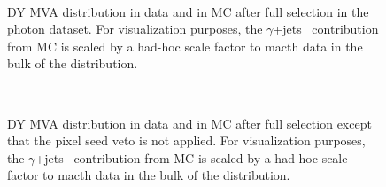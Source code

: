 \begin{figure}[!hbtp]
\begin{center}
\\
\caption{DY MVA distribution in data and in MC after full selection in the photon dataset.
For visualization purposes, the $\gamma$+jets~ contribution from MC is scaled by a had-hoc scale factor to macth data in the bulk of the distribution.
}
\label{fig:dymva_noscale}
\end{center}
\end{figure}

\begin{figure}[!hbtp]
\begin{center}
\\
\caption{DY MVA distribution in data and in MC after full selection except that the pixel seed veto is not applied.
For visualization purposes, the $\gamma$+jets~ contribution from MC is scaled by a had-hoc scale factor to macth data in the bulk of the distribution.
}
\label{fig:dymva_noseedveto}
\end{center}
\end{figure}


